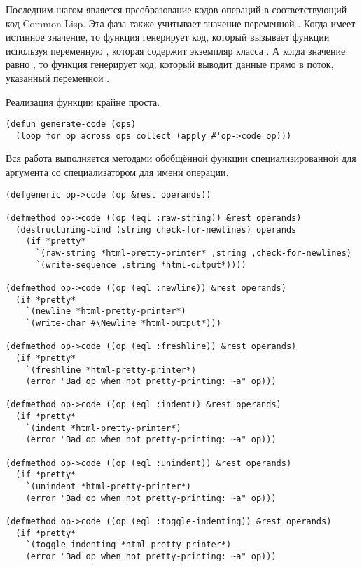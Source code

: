 Последним шагом является преобразование кодов операций в соответствующий код Common
Lisp. Эта фаза также учитывает значение переменной . Когда 
имеет истинное значение, то функция генерирует код, который вызывает функции используя
переменную , которая содержит экземпляр класса
.  А когда значение  равно , то функция
генерирует код, который выводит данные прямо в поток, указанный переменной
.

Реализация функции  крайне проста.

\begin{lstlisting}
(defun generate-code (ops)
  (loop for op across ops collect (apply #'op->code op)))
\end{lstlisting}

Вся работа выполняется методами обобщённой функции  специализированной для
аргумента  со специализатором  для имени операции.

\begin{lstlisting}
(defgeneric op->code (op &rest operands))

(defmethod op->code ((op (eql :raw-string)) &rest operands)
  (destructuring-bind (string check-for-newlines) operands
    (if *pretty*
      `(raw-string *html-pretty-printer* ,string ,check-for-newlines)
      `(write-sequence ,string *html-output*))))

(defmethod op->code ((op (eql :newline)) &rest operands)
  (if *pretty*
    `(newline *html-pretty-printer*)
    `(write-char #\Newline *html-output*)))    

(defmethod op->code ((op (eql :freshline)) &rest operands)
  (if *pretty*
    `(freshline *html-pretty-printer*)
    (error "Bad op when not pretty-printing: ~a" op)))

(defmethod op->code ((op (eql :indent)) &rest operands)
  (if *pretty*
    `(indent *html-pretty-printer*)
    (error "Bad op when not pretty-printing: ~a" op)))

(defmethod op->code ((op (eql :unindent)) &rest operands)
  (if *pretty*
    `(unindent *html-pretty-printer*)
    (error "Bad op when not pretty-printing: ~a" op)))

(defmethod op->code ((op (eql :toggle-indenting)) &rest operands)
  (if *pretty*
    `(toggle-indenting *html-pretty-printer*)
    (error "Bad op when not pretty-printing: ~a" op)))
\end{lstlisting}

